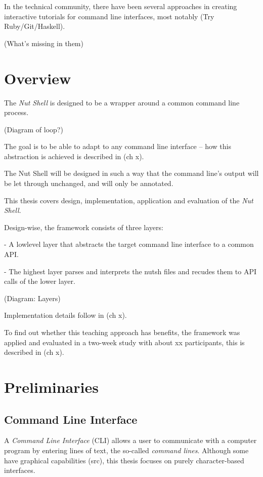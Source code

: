\documentclass[twoside,blue]{tubsreprt}
\begin{document}
In the technical community, there have been several approaches in creating interactive tutorials for command line interfaces, most notably (Try Ruby/Git/Haskell).

(What's missing in them)

\chapter{Overview}

The \emph{Nut Shell} is designed to be a wrapper around a common command line process.

(Diagram of loop?)

The goal is to be able to adapt to any command line interface -- how this abstraction is achieved is described in (ch x).

The Nut Shell will be designed in such a way that the command line's output will be let through unchanged, and will only be annotated.

This thesis covers design, implementation, application and evaluation of the \emph{Nut Shell}.

Design-wise, the framework consists of three layers:

- A lowlevel layer that abstracts the target command line interface to a common API.

- The highest layer parses and interprets the nutsh files and recudes them to API calls of the lower layer.

(Diagram: Layers)

Implementation details follow in (ch x).

To find out whether this teaching approach has benefits, the framework was applied and evaluated in a two-week study with about xx participants, this is described in (ch x).

\chapter{Preliminaries}

\section{Command Line Interface}

A \emph{Command Line Interface} (\textsc{CLI}) allows a user to communicate with a computer program by entering lines of text, the so-called \emph{command lines}. Although some have graphical capabilities (src), this thesis focuses on purely character-based interfaces.
\end{document}
